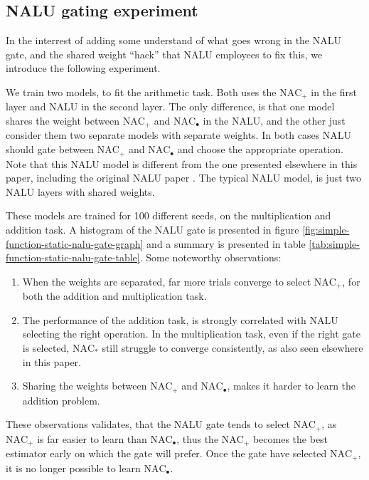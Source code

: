 \subsection{NALU gating experiment}
\label{sec:appendix:nalu-gate-experiment}

In the interrest of adding some understand of what goes wrong in the NALU gate, and the shared weight ``hack'' that NALU employees to fix this, we introduce the following experiment.

We train two models, to fit the arithmetic task. Both uses the $\mathrm{NAC}_{+}$ in the first layer and NALU in the second layer. The only difference, is that one model shares the weight between $\mathrm{NAC}_{+}$ and $\mathrm{NAC}_{\bullet}$ in the NALU, and the other just consider them two separate models with separate weights. In both cases NALU should gate between $\mathrm{NAC}_{+}$ and $\mathrm{NAC}_{\bullet}$ and choose the appropriate operation. Note that this NALU model is different from the one presented elsewhere in this paper, including the original NALU paper \cite{trask-nalu}. The typical NALU model, is just two NALU layers with shared weights.

These models are trained for 100 different seeds, on the multiplication and addition task. A histogram of the NALU gate is presented in figure \ref{fig:simple-function-static-nalu-gate-graph} and a summary is presented in table \ref{tab:simple-function-static-nalu-gate-table}. Some noteworthy observations:

\begin{enumerate}
    \item When the weights are separated, far more trials converge to select $\mathrm{NAC}_{+}$, for both the addition and multiplication task.
    \item The performance of the addition task, is strongly correlated with NALU selecting the right operation. In the multiplication task, even if the right gate is selected, $\mathrm{NAC}_{*}$ still struggle to converge consistently, as also seen elsewhere in this paper.
    \item Sharing the weights between $\mathrm{NAC}_{+}$ and $\mathrm{NAC}_{\bullet}$, makes it harder to learn the addition problem. 
\end{enumerate}

These observations validates, that the NALU gate tends to select $\mathrm{NAC}_{+}$, as $\mathrm{NAC}_{+}$ is far easier to learn than $\mathrm{NAC}_{\bullet}$, thus the $\mathrm{NAC}_{+}$ becomes the best estimator early on which the gate will prefer. Once the gate have selected $\mathrm{NAC}_{+}$, it is no longer possible to learn $\mathrm{NAC}_{\bullet}$.

